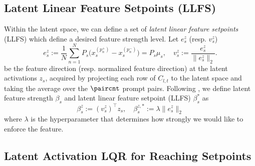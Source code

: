 \documentclass{article}
\begin{document}
\vspace{-10pt}
\subsection{Latent Linear Feature Setpoints (LLFS)}
\label{subsec:linearfeaturesetpoint}
\vspace{-6pt}

Within the latent space, we can define a set of \textit{latent linear feature setpoints} (LLFS) which define a desired feature strength level.
Let $e_s^z$ (resp. $v_s^z$)
\begin{equation}\label{eq:projected_contrastive}
    e^z_s := \textstyle\frac{1}{N}\sum_{n=1}^N P_s\big(x^{(p_n^+)}_s - x^{(p_n^-)}_s\big)
       = P_s \mu_s,
\quad
v^z_s := \frac{e^z_s}{\|e^z_s\|_2}.
\end{equation}
be the feature direction (resp. normalized feature direction) at the latent activations $z_s$, acquired by projecting each row of $C_{l,t}$ to the latent space and taking the average over the $\paircnt$ prompt pairs.
Following \cite{skifstad2026local}, we define latent feature strength $\beta_s$ and latent linear feature setpoint (LLFS) $\beta_s^\ast$ as
\begin{equation}\label{eq:lfs}
    \beta_{s}^z:= {(v_{s}^z)}^\top z_s,\quad
    \beta_s^{z,\ast}:=\lambda \|e_s^z\|_2
\end{equation}
where $\lambda$ is the hyperparameter that determines how strongly we would like to enforce the feature. 

\vspace{-5pt}
\subsection{Latent Activation LQR for Reaching Setpoints}
\label{subsec:latent_activation_lqr}
\vspace{-5pt}
\end{document}
